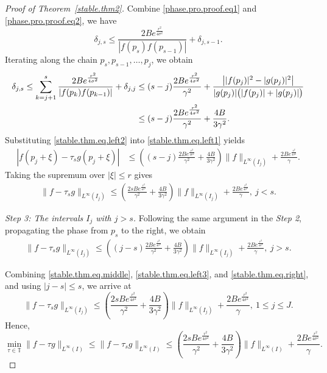 \documentclass[11pt, reqno]{amsart}
\numberwithin{equation}{section}
\begin{document}
\begin{proof}[Proof of Theorem~\ref{stable.thm2}]
Combine \eqref{phase.pro.proof.eq1} and \eqref{phase.pro.proof.eq2}, we have 
$$\delta_{j,s} \le \frac{2Be^{\frac{r^2}{4\sigma^2}}}{|f(p_s)f(p_{s-1})|} +
\delta_{j,s-1}.$$ 
Iterating  along the chain  $p_s,p_{s-1},\dots,p_j$, 
we obtain
\begin{align}\label{stable.thm.eq.left2}
\delta_{j,s}\le \sum_{k=j+1}^s \frac{2Be^{\frac{r^2}{4\sigma^2}}}{|f(p_k)f(p_{k-1})|} +\delta_{j ,j}&\le (s-j)\frac{2Be^{\frac{r^2}{4\sigma^2}}}{\gamma^2}   
+\frac{\bigl||f(p_j)|^2-|g(p_j)|^2\bigr|}{|g(p_j)|\bigl(|f(p_j)|+|g(p_j)|\bigr)} \notag\\
& \le (s-j)\frac{2Be^{\frac{r^2}{4\sigma^2}}}{\gamma^2}
+ \frac{4B}{3\gamma^2}.
\end{align}
Substituting \eqref{stable.thm.eq.left2} into \eqref{stable.thm.eq.left1} yields
\begin{align*}
|f(p_j+\xi)-\tau_s g(p_j+\xi)| &\le \left( (s-j)\frac{2Be^{\frac{r^2}{4\sigma^2}}}{\gamma^2} +\frac{4B}{3\gamma^2}\right)\|f\|_{L^\infty(I_j)}
+\frac{2Be^{\frac{r^2}{4\sigma^2}}}{\gamma}. 
\end{align*}
Taking the supremum over $|\xi|\le r$ gives
\begin{align}\label{stable.thm.eq.left3}
    \|f-\tau_s g\|_{L^\infty(I_j)} \le \left( \frac{2sBe^{\frac{r^2}{4\sigma^2}}}{\gamma^2}
+ \frac{4B}{3\gamma^2} \right) \|f\|_{L^\infty(I_j)} + \frac{2Be^{\frac{r^2}{4\sigma^2}}}{\gamma}, \  j<s.
\end{align}


\medskip
\noindent
\emph{Step 3: The intervals \(I_j\) with \(j>s\).}
Following the same argument in the \emph{Step 2}, propagating the phase from $p_s$ to the right, we obtain
\begin{align}\label{stable.thm.eq.right}
\|f-\tau_s g\|_{L^\infty(I_j)} \le \left( (j-s)\frac{2Be^{\frac{r^2}{4\sigma^2}}}{\gamma^2}
+ \frac{4B}{3\gamma^2} \right) \|f\|_{L^\infty(I_j)} + \frac{2Be^{\frac{r^2}{4\sigma^2}}}{\gamma}, \  j>s.
\end{align}

Combining \eqref{stable.thm.eq.middle}, \eqref{stable.thm.eq.left3}, and
\eqref{stable.thm.eq.right}, and using $|j-s|\le s$, we arrive at
\begin{equation*}
\|f-\tau_s g\|_{L^\infty(I_j)} \le \left( \frac{2sBe^{\frac{r^2}{4\sigma^2}}}{\gamma^2}
+ \frac{4B}{3\gamma^2} \right)\|f\|_{L^\infty(I_j)} + \frac{2Be^{\frac{r^2}{4\sigma^2}}}{\gamma},
\ 1\le j\le J.
\end{equation*}
Hence,
\begin{equation}\label{stable.thm.eq.case1}
\min_{\tau\in\mathbb T}\|f-\tau g\|_{L^\infty(I)} \le \|f-\tau_s g\|_{L^\infty(I)} \le \left( \frac{2sBe^{\frac{r^2}{4\sigma^2}}}{\gamma^2} +
\frac{4B}{3\gamma^2} \right)\|f\|_{L^\infty(I)} + \frac{2Be^{\frac{r^2}{4\sigma^2}}}{\gamma}.
\end{equation}


\end{proof}
\end{document}
